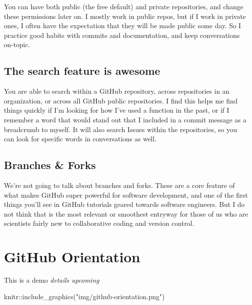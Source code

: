 \documentclass[
  letterpaper,
  DIV=11,
  numbers=noendperiod]{scrreprt}
\newenvironment{Shaded}{\begin{snugshade}}{\end{snugshade}}
\newcommand{\FunctionTok}[1]{\textcolor[rgb]{0.28,0.35,0.67}{#1}}
\newcommand{\NormalTok}[1]{\textcolor[rgb]{0.00,0.48,0.65}{#1}}
\newcommand{\SpecialCharTok}[1]{\textcolor[rgb]{0.37,0.37,0.37}{#1}}
\newcommand{\StringTok}[1]{\textcolor[rgb]{0.13,0.47,0.30}{#1}}
\begin{document}
You can have both public (the free default) and private repositories,
and change these permissions later on. I mostly work in public repos,
but if I work in private ones, I often have the expectation that they
will be made public some day. So I practice good habits with commits and
documentation, and keep conversations on-topic.

\hypertarget{the-search-feature-is-awesome}{%
\subsection{The search feature is
awesome}\label{the-search-feature-is-awesome}}

You are able to search within a GitHub repository, across repositories
in an organization, or across all GitHub public repositories. I find
this helps me find things quickly if I'm looking for how I've used a
function in the past, or if I remember a word that would stand out that
I included in a commit message as a breadcrumb to myself. It will also
search Issues within the repositories, so you can look for specific
words in conversations as well.

\hypertarget{branches-forks}{%
\subsection{Branches \& Forks}\label{branches-forks}}

We're not going to talk about branches and forks. These are a core
feature of what makes GitHub super powerful for software development,
and one of the first things you'll see in GitHub tutorials geared
towards software engineers. But I do not think that is the most relevant
or smoothest entryway for those of us who are scientists fairly new to
collaborative coding and version control.

\hypertarget{github-orientation}{%
\section{GitHub Orientation}\label{github-orientation}}

This is a demo \emph{details upcoming}

\begin{Shaded}
\begin{Highlighting}[]
\NormalTok{knitr}\SpecialCharTok{::}\FunctionTok{include\_graphics}\NormalTok{(}\StringTok{"img/github{-}orientation.png"}\NormalTok{)  }
\end{Highlighting}
\end{Shaded}
\end{document}

